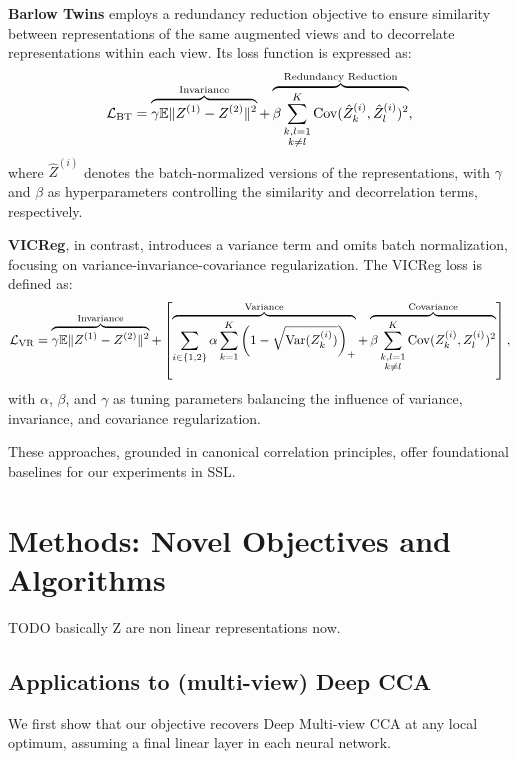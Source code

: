 \textbf{Barlow Twins} employs a redundancy reduction objective to ensure similarity between representations of the same augmented views and to decorrelate representations within each view.
Its loss function is expressed as:
\begin{align}
    \mathcal{L}_\text{BT} = \overbrace{\gamma \mathbb{E} \lVert Z^{(1)} - Z^{(2)}\rVert^2}^{\text{Invariance}} + \overbrace{\beta \sum_{\substack{k,l=1 \\ k \neq l}}^K \mathrm{Cov}(\hat{Z}^{(i)}_k, \hat{Z}^{(i)}_l)^2}^{\text{Redundancy Reduction}},
\end{align}
where \( \hat{Z}^{(i)} \) denotes the batch-normalized versions of the representations, with \( \gamma \) and \( \beta \) as hyperparameters controlling the similarity and decorrelation terms, respectively.

\textbf{VICReg}, in contrast, introduces a variance term and omits batch normalization, focusing on variance-invariance-covariance regularization.
The VICReg loss is defined as:
\begin{align}
    \mathcal{L}_\text{VR} = \overbrace{\gamma \mathbb{E} \lVert Z^{(1)} - Z^{(2)}\rVert^2}^{\text{Invariance}} + \left[\overbrace{\sum_{i \in \{1,2\}} \alpha \sum_{k=1}^K \left(1 - \sqrt{\mathrm{Var}(Z^{(i)}_k)}\right)_+}^{\text{Variance}} + \overbrace{\beta \sum_{\substack{k,l=1 \\ k \neq l}}^K \mathrm{Cov}(Z^{(i)}_k, Z^{(i)}_l)^2 }^{\text{Covariance}}\right],
\end{align}
with \( \alpha \), \( \beta \), and \( \gamma \) as tuning parameters balancing the influence of variance, invariance, and covariance regularization.

These approaches, grounded in canonical correlation principles, offer foundational baselines for our experiments in SSL.


\section{Methods: Novel Objectives and Algorithms}

TODO basically Z are non linear representations now.

\subsection{Applications to (multi-view) Deep CCA}

We first show that our objective recovers Deep Multi-view CCA at any local optimum, assuming a final linear layer in each neural network.

